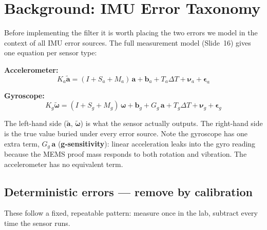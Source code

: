 \documentclass[12pt, a4paper]{article}
\begin{document}
\clearpage
\section*{Background: IMU Error Taxonomy}

Before implementing the filter it is worth placing the two errors we
model in the context of all IMU error sources.
The full measurement model (Slide~16) gives one equation per sensor type:

\textbf{Accelerometer:}
\[
  K_a\tilde{\mathbf{a}}
    = (I + S_a + M_a)\,\mathbf{a}
      + \mathbf{b}_a
      + T_a\Delta T
      + \boldsymbol{\nu}_a
      + \boldsymbol{\epsilon}_a
\]

\textbf{Gyroscope:}
\[
  K_g\tilde{\boldsymbol{\omega}}
    = (I + S_g + M_g)\,\boldsymbol{\omega}
      + \mathbf{b}_g
      + G_g\,\mathbf{a}
      + T_g\Delta T
      + \boldsymbol{\nu}_g
      + \boldsymbol{\epsilon}_g
\]

The left-hand side ($\tilde{\mathbf{a}}$, $\tilde{\boldsymbol{\omega}}$) is what
the sensor actually outputs.
The right-hand side is the true value buried under every error source.
Note the gyroscope has one extra term, $G_g\,\mathbf{a}$
(\textbf{g-sensitivity}): linear acceleration leaks into the gyro reading
because the MEMS proof mass responds to both rotation and vibration.
The accelerometer has no equivalent term.

\subsection*{Deterministic errors --- remove by calibration}

These follow a fixed, repeatable pattern: measure once in the lab,
subtract every time the sensor runs.
\end{document}
